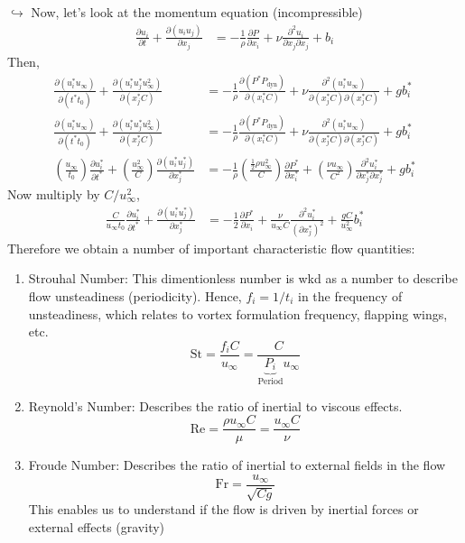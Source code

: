 $\hookrightarrow$ Now, let's look at the momentum equation (incompressible)
\begin{align*}
    \frac{\partial u_i}{\partial t} + \frac{\partial (u_i u_j)}{\partial x_j} &= - \frac{1}{\rho} \frac{\partial P}{\partial x_i} + \nu \frac{\partial^2 u_i}{\partial x_j \partial x_j} + b_i
\end{align*}
Then,
\begin{align*}
    \frac{\partial (u_i^* u_{\infty})}{\partial (t^* t_0)} + \frac{\partial (u_i^* u_j^* u_{\infty}^2)}{\partial (x_j^* C)} 
    &= - \frac{1}{\rho} \frac{\partial (P^* P_{\text{dyn}})}{\partial (x_i^* C)} + \nu \frac{\partial^2 (u_i^* u_{\infty})}{\partial (x_j^* C) \partial (x_j^* C)} + g b_i^* \\
    \frac{\partial (u_i^* u_{\infty})}{\partial (t^* t_0)} + \frac{\partial (u_i^* u_j^* u_{\infty}^2)}{\partial (x_j^* C)}
    &= - \frac{1}{\rho} \frac{\partial (P^* P_{\text{dyn}})}{\partial (x_i^* C)} + \nu \frac{\partial^2 (u_i^* u_{\infty})}{\partial (x_j^* C) \partial (x_j^* C)} + g b_i^* \\
    \left(\frac{u_{\infty}}{t_0}\right) \frac{\partial u_i^*}{\partial t^*} + \left(\frac{u_{\infty}^2}{C}\right) \frac{\partial (u_i^* u_j^*)}{\partial x_j^*}
    &= - \frac{1}{\rho} \left(\frac{\frac{1}{2}\rho u_{\infty}^2}{C}\right) \frac{\partial P^*}{\partial x_i^*} + \left(\frac{\nu u_{\infty}}{C^2}\right) \frac{\partial^2 u_i^*}{\partial x_j^* \partial x_j^*} + g b_i^* 
\end{align*}
Now multiply by $C/u_{\infty}^2$,
\begin{align*}
    \frac{C}{u_\infty t_0}\frac{\partial u_i^*}{\partial t^*} + \frac{\partial (u_i^* u_j^*)}{\partial x_j^*}
    &= - \frac{1}{2} \frac{\partial P^*}{\partial x_i} + \frac{\nu}{u_{\infty} C} \frac{\partial^2 u_i^*}{(\partial x_j^*)^2} + \frac{g C}{u_{\infty}^2} b_i^*
\end{align*}
Therefore we obtain a number of important characteristic flow quantities:
\begin{enumerate}
    \item Strouhal Number: This dimentionless number is wkd as a number to describe flow unsteadiness (periodicity). Hence, $f_i = 1/t_i$ in the frequency of unsteadiness, which relates to vortex formulation frequency, flapping wings, etc.
    \begin{equation*}
        \text{St} = \frac{f_i C}{u_{\infty}} = \frac{C}{\underbrace{P_i}_{\text{Period}} u_{\infty}}
    \end{equation*}
    \item Reynold's Number: Describes the ratio of inertial to viscous effects.
    \begin{equation*}
        \text{Re} = \frac{\rho u_{\infty} C}{\mu} = \frac{u_{\infty} C}{\nu}
    \end{equation*}
    \item Froude Number: Describes the ratio of inertial to external fields in the flow
    \begin{equation*}
        \text{Fr} = \frac{u_{\infty}}{\sqrt{Cg}}
    \end{equation*}
    This enables us to understand if the flow is driven by inertial forces or external effects (gravity)
\end{enumerate}
